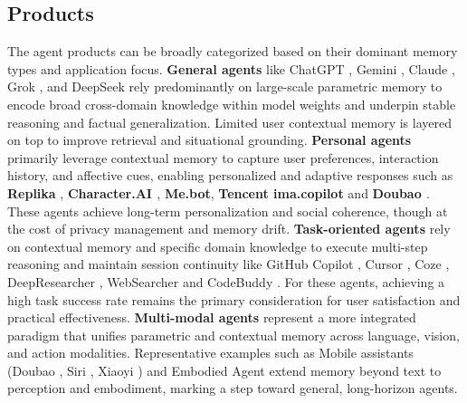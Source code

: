 \documentclass[manuscript,screen]{acmart}
\begin{document}
\subsection{Products}
The agent products can be broadly categorized based on their dominant memory types and application focus. \textbf{General agents} like ChatGPT \citep{openai2023chatgpt}, Gemini \citep{gemini2024}, Claude \citep{claude2023}, Grok \citep{grok2023}, and DeepSeek \citep{liu2024deepseek} rely predominantly on large-scale parametric memory to encode broad cross-domain knowledge within model weights and underpin stable reasoning and factual generalization. Limited user contextual memory is layered on top to improve retrieval and situational grounding. \textbf{Personal agents} primarily leverage contextual memory to capture user preferences, interaction history, and affective cues, enabling personalized and adaptive responses \citep{li2024hello, qin2025ui, hong2023cogagent} such as \textbf{Replika} \citep{replika2025}, \textbf{Character.AI \citep{characterai2023}},  \textbf{Me.bot}, \textbf{Tencent ima.copilot} \citep{imacopilot2025} and \textbf{Doubao \citep{doubao2025}}. These agents achieve long-term personalization and social coherence, though at the cost of privacy management and memory drift. \textbf{Task-oriented agents} rely on contextual memory and specific domain knowledge to execute multi-step reasoning and maintain session continuity like GitHub Copilot \citep{githubcopilot}, Cursor \citep{cursor2024}, Coze \citep{coze2024}, DeepResearcher \citep{tongyidr}, WebSearcher \citep{tongyidr} and CodeBuddy \citep{zhao2024codebuddy}. For these agents, achieving a high task success rate remains the primary consideration for user satisfaction and practical effectiveness. \textbf{Multi-modal agents} represent a more integrated paradigm that unifies parametric and contextual memory across language, vision, and action modalities. Representative examples such as Mobile assistants (Doubao \citep{doubao2025}, Siri \citep{siri2025}, Xiaoyi \citep{xiaoyi2025}) and Embodied Agent extend memory beyond text to perception and embodiment, marking a step toward general, long-horizon agents.
\end{document}
